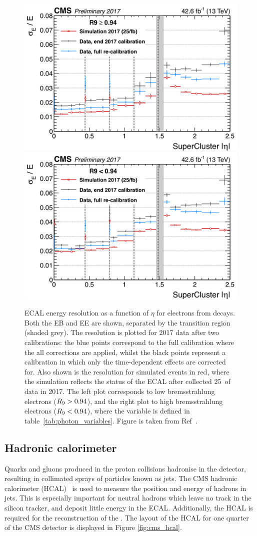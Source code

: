\begin{figure}[htb!]
  \centering
  \includegraphics[width=.49\textwidth]{Figures/cms/2017_resolution_highR9.png}
  \includegraphics[width=.49\textwidth]{Figures/cms/2017_resolution_lowR9.png}
  \caption[ECAL energy resolution in 2017 data]
  {
    ECAL energy resolution as a function of $\eta$ for electrons from \Zee decays. Both the EB and EE are shown, separated by the transition region (shaded grey). The resolution is plotted for 2017 data after two calibrations: the blue points correspond to the full calibration where the all corrections are applied, whilst the black points represent a calibration in which only the time-dependent effects are corrected for. Also shown is the resolution for simulated \Zee events in red, where the simulation reflects the status of the ECAL after collected 25~\fbinv of data in 2017. The left plot corresponds to low bremsstrahlung electrons ($R_9>0.94$), and the right plot to high bremsstrahlung electrons ($R_9<0.94$), where the variable \RNINE is defined in table~\ref{tab:photon_variables}. Figure is taken from Ref~\cite{CMS-DP-2018-015}.
  }
  \label{fig:ecal_energy_resolution}
\end{figure}

\subsection{Hadronic calorimeter}\label{sec:cms_hcal}
Quarks and gluons produced in the proton collisions hadronise in the detector, resulting in collimated sprays of particles known as jets. The CMS hadronic calorimeter (HCAL)~\cite{} is used to measure the position and energy of hadrons in jets. This is especially important for neutral hadrons which leave no track in the silicon tracker, and deposit little energy in the ECAL. Additionally, the HCAL is required for the reconstruction of the \met. The layout of the HCAL for one quarter of the CMS detector is displayed in Figure \ref{fig:cms_hcal}.

